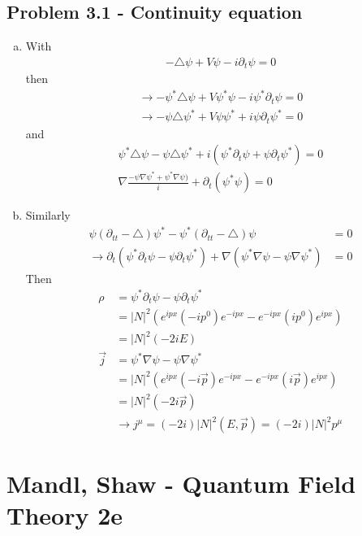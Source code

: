 \documentclass[../main.tex]{subfiles}
\begin{document}
\subsection{Problem 3.1 - Continuity equation}
\begin{enumerate}[(a)]
\item
With
\begin{align}
-\triangle\psi+V\psi-i\partial_t\psi=0
\end{align}
then
\begin{align}
\rightarrow -\psi^*\triangle\psi+V\psi^*\psi-i\psi^*\partial_t\psi=0\\
\rightarrow -\psi\triangle\psi^*+V\psi\psi^*+i\psi\partial_t\psi^*=0
\end{align}
and
\begin{align}
 \psi^*\triangle\psi-\psi\triangle\psi^*+i(\psi^*\partial_t\psi+\psi\partial_t\psi^*)=0\\
 \nabla\frac{-\psi\nabla\psi^*+\psi^*\nabla\psi)}{i}+\partial_t(\psi^*\psi)=0
\end{align}

\item Similarly
\begin{align}
\psi(\partial_{tt}-\triangle)\psi^*-\psi^*(\partial_{tt}-\triangle)\psi&=0\\
\rightarrow\partial_t(\psi^*\partial_t\psi-\psi\partial_t\psi^*)+\nabla(\psi^*\nabla\psi-\psi\nabla\psi^*)&=0
\end{align}
Then
\begin{align}
\rho&=\psi^*\partial_t\psi-\psi\partial_t\psi^*\\
&=|N|^2(e^{ipx}(-ip^0)e^{-ipx}-e^{-ipx}(ip^0)e^{ipx})\\
&=|N|^2(-2iE)\\
\vec{j}&=\psi^*\nabla\psi-\psi\nabla\psi^*\\
&=|N|^2(e^{ipx}(-i\vec{p})e^{-ipx}-e^{-ipx}(i\vec{p})e^{ipx})\\
&=|N|^2(-2i\vec{p})\\
&\rightarrow j^\mu=(-2i)|N|^2(E,\vec{p})=(-2i)|N|^2 p^\mu
\end{align}


\end{enumerate}

\section{{\sc Mandl, Shaw} - Quantum Field Theory 2e}
\end{document}
